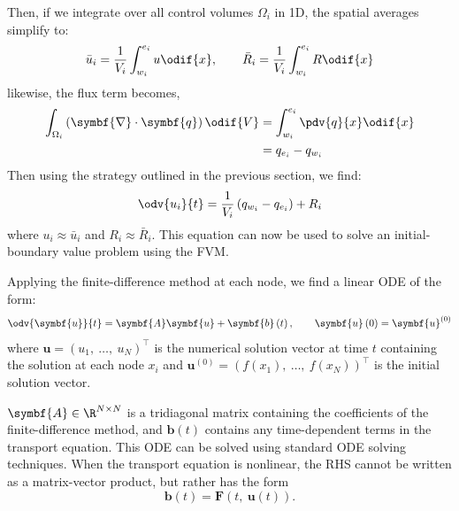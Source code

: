 \documentclass{article}
\begin{document}
Then, if we integrate over all control volumes \(\Omega_i\) in 1D, the
spatial averages simplify to:
\begin{equation*}
    \bar{u}_i = \frac{1}{V_i} \int_{w_i}^{e_i} u \odif{x}, \qquad \bar{R}_i = \frac{1}{V_i} \int_{w_i}^{e_i} R \odif{x}
\end{equation*}
likewise, the flux term becomes,
\begin{align*}
    \int_{\Omega_i} \left( \symbf{\nabla} \cdot \symbf{q} \right) \odif{V} & = \int_{w_i}^{e_i} \pdv{q}{x} \odif{x} \\
                                                                           & = q_{e_i} - q_{w_i}
\end{align*}
Then using the strategy outlined in the previous section, we find:
\begin{equation*}
    \odv{u_i}{t} = \frac{1}{V_i} \left( q_{w_i} - q_{e_i} \right) + R_i
\end{equation*}
where \(u_i \approx \bar{u}_i\) and \(R_i \approx \bar{R}_i\). This equation
can now be used to solve an initial-boundary value problem using the FVM.

Applying the finite-difference method at each node, we find a linear ODE
of the form:
\begin{equation*}
    \odv{\symbf{u}}{t} = \symbf{A} \symbf{u} + \symbf{b}\left( t \right), \qquad \symbf{u}\left( 0 \right) = \symbf{u}^{\left( 0 \right)}
\end{equation*}
where \(\symbf{u} = {\left( u_1,\: \dots,\: u_N \right)}^\top\) is the
numerical solution vector at time \(t\) containing the solution at each
node \(x_i\) and \(\symbf{u}^{\left( 0 \right)} = {\left( f\left( x_1 \right),\: \dots,\: f\left( x_N \right) \right)}^\top\)
is the initial solution vector.

\(\symbf{A} \in \R^{N \times N}\) is a tridiagonal matrix containing
the coefficients of the finite-difference method, and
\(\symbf{b}\left( t \right)\) contains any time-dependent terms in the
transport equation. This ODE can be solved using standard ODE solving
techniques. When the transport equation is nonlinear, the RHS cannot
be written as a matrix-vector product, but rather has the form
\begin{equation*}
    \symbf{b}\left( t \right) = \symbf{F}\left( t,\: \symbf{u}\left( t \right) \right).
\end{equation*}
\end{document}
